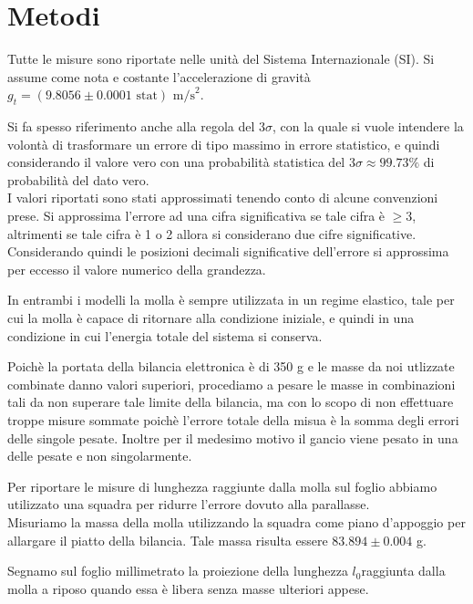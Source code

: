 \documentclass[italian, a4paper, 10pt, twocolumn]{../../style/lab_unige}
\newcommand{\gLab}{$g_t=(9.8056\pm0.0001 \text{ stat}) \text{ m/s}^2$\space}
\newcommand{\treSigma}{$3\sigma$\space}
\newcommand{\Lo}{$l_0$\space}
\begin{document}
    \section{Metodi}
    \label{section:methods}
    Tutte le misure sono riportate nelle unità del Sistema Internazionale (SI). Si assume come nota e costante 
    l'accelerazione di gravità \gLab .

    
    Si fa spesso riferimento anche alla regola del \treSigma, con la quale si vuole intendere la volontà di 
    trasformare un errore di tipo massimo in errore statistico, e quindi considerando il valore vero con una
    probabilità statistica del \treSigma $\approx99.73\%$ di probabilità del dato vero.\\
    I valori riportati sono stati approssimati tenendo conto di alcune convenzioni prese. Si approssima 
    l'errore ad una cifra significativa se tale cifra è $\geqslant3$, altrimenti se tale cifra è 1 o 2 allora
    si considerano due cifre significative. Considerando quindi le posizioni decimali significative dell'errore
    si approssima per eccesso il valore numerico della grandezza. 

    In entrambi i modelli la molla è sempre utilizzata in un regime elastico, tale per cui la molla è capace
    di ritornare alla condizione iniziale, e quindi in una condizione in cui l'energia totale del sistema si 
    conserva.

    Poichè la portata della bilancia elettronica è di 350 g e le masse da noi utlizzate combinate danno valori
    superiori, procediamo a pesare le masse in combinazioni tali da non superare tale limite della bilancia, ma 
    con lo scopo di non effettuare troppe misure sommate poichè l'errore totale della misua è la somma degli
    errori delle singole pesate. Inoltre per il medesimo motivo il gancio viene pesato in una delle pesate e non 
    singolarmente.

    Per riportare le misure di lunghezza raggiunte dalla molla sul foglio abbiamo utilizzato una squadra per 
    ridurre l'errore dovuto alla parallasse.\\

    Misuriamo la massa della molla utilizzando la squadra come piano d'appoggio per allargare il piatto della 
    bilancia. Tale massa risulta essere $83.894\pm0.004$ g.

    Segnamo sul foglio millimetrato la proiezione della lunghezza \Lo raggiunta dalla molla a riposo quando essa
    è libera senza masse ulteriori appese. 
\end{document}

